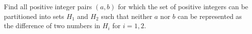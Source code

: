 Find all positive integer pairs $(a,b)$ for which the set of positive integers can be partitioned into sets $H_1$ and $H_2$ such that neither $a$ nor $b$ can be represented as the difference of two numbers in $H_i$ for $i=1,2$.